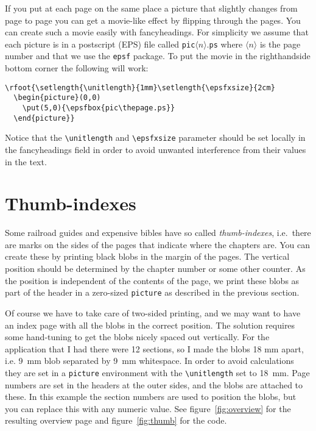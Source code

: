 \documentclass[a4paper]{article}
\makeatletter
\newcommand{\TTindex}[1]{\index{#1@\texttt{#1}}}
\makeatother
\begin{document}
\TTindex{picture}
If you put at each page on the same place a picture that slightly changes
from page to page you can get a movie-like effect by flipping through the
pages. You can create such a movie easily with fancyheadings. For
simplicity we assume that each picture is in a postscript (EPS) file called
\texttt{pic}$\langle n\rangle$.\texttt{ps} where $\langle n\rangle$ is the page number and that we use
the \texttt{epsf} package. 
\TTindex{epsf}
To put the movie in the  righthandside bottom corner the following will work:

\begin{verbatim}
\rfoot{\setlength{\unitlength}{1mm}\setlength{\epsfxsize}{2cm}
  \begin{picture}(0,0)
    \put(5,0){\epsfbox{pic\thepage.ps}}
  \end{picture}}
\end{verbatim}

Notice that the \verb|\unitlength| and \verb|\epsfxsize| parameter should
be set locally in the fancyheadings field in order to avoid unwanted
interference from their values in the text.

\section{Thumb-indexes}
\label{sec:thumb}

Some railroad guides and expensive bibles have so called
\emph{thumb-indexes}, i.e.\ there are marks on the sides of the pages that
indicate where the chapters are. You can create these by printing black
blobs in the margin of the pages. The vertical position should be
determined by the chapter number or some other counter. As the position is
independent of the contents of the page, we print these blobs as part of
the header in a zero-sized \texttt{picture} as described in the previous
section.

Of course we have to take care of two-sided printing, and we may want to
have an index page with all the blobs in the correct position. The solution
requires some hand-tuning to get the blobs nicely spaced out vertically.
For the application that I had there were 12 sections, so I made the blobs
18 mm apart, i.e. 9~mm blob separated by 9~mm whitespace. In order to avoid
calculations they are set in a \texttt{picture} environment with the
\verb|\unitlength| set to 18~mm. Page numbers are set in the headers at the
outer sides, and the blobs are attached to these. In this example the
section numbers are used to position the blobs, but you can replace this
with any numeric value. See figure~\ref{fig:overview} for the resulting
overview page and figure~\ref{fig:thumb} for the code.
\end{document}
